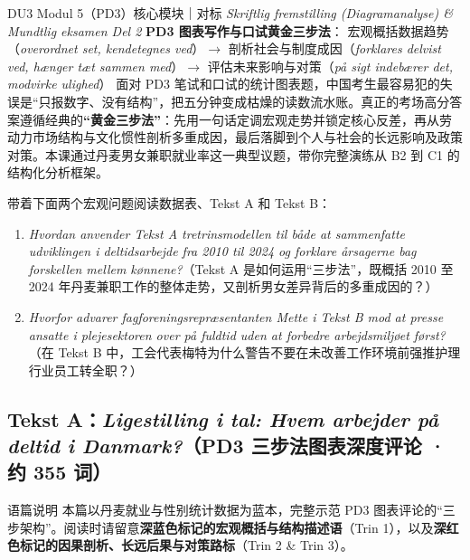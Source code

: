 {DU3 Modul 5（PD3）核心模块｜对标 \textit{Skriftlig fremstilling (Diagramanalyse) \& Mundtlig eksamen Del 2}}
{\textbf{PD3 图表写作与口试黄金三步法}： 宏观概括数据趋势（\textit{overordnet set, kendetegnes ved}）$\rightarrow$  剖析社会与制度成因（\textit{forklares delvist ved, hænger tæt sammen med}）$\rightarrow$  评估未来影响与对策（\textit{på sigt indebærer det, modvirke ulighed}）}
{面对 PD3 笔试和口试的统计图表题，中国考生最容易犯的失误是“只报数字、没有结构”，把五分钟变成枯燥的读数流水账。真正的考场高分答案遵循经典的\textbf{“黄金三步法”}：先用一句话定调宏观走势并锁定核心反差，再从劳动力市场结构与文化惯性剖析多重成因，最后落脚到个人与社会的长远影响及政策对策。本课通过丹麦男女兼职就业率这一典型议题，带你完整演练从 B2 到 C1 的结构化分析框架。}

\begin{foerduleaeser}
带着下面两个宏观问题阅读数据表、Tekst A 和 Tekst B：
\begin{enumerate}
  \item \textit{Hvordan anvender Tekst A tretrinsmodellen til både at sammenfatte udviklingen i deltidsarbejde fra 2010 til 2024 og forklare årsagerne bag forskellen mellem kønnene?}（Tekst A 是如何运用“三步法”，既概括 2010 至 2024 年丹麦兼职工作的整体走势，又剖析男女差异背后的多重成因的？）
  \item \textit{Hvorfor advarer fagforeningsrepræsentanten Mette i Tekst B mod at presse ansatte i plejesektoren over på fuldtid uden at forbedre arbejdsmiljøet først?}（在 Tekst B 中，工会代表梅特为什么警告不要在未改善工作环境前强推护理行业员工转全职？）
\end{enumerate}
\end{foerduleaeser}


\subsection*{Tekst A：\textit{Ligestilling i tal: Hvem arbejder på deltid i Danmark?}（PD3 三步法图表深度评论 · 约 355 词）}

\begin{tipbox}{语篇说明}
本篇以丹麦就业与性别统计数据为蓝本，完整示范 PD3 图表评论的“三步架构”。阅读时请留意\textbf{\color{NCDNavy}深蓝色标记的宏观概括与结构描述语}（Trin 1），以及\textbf{\color{NCDRed}深红色标记的因果剖析、长远后果与对策路标}（Trin 2 \& Trin 3）。
\end{tipbox}

